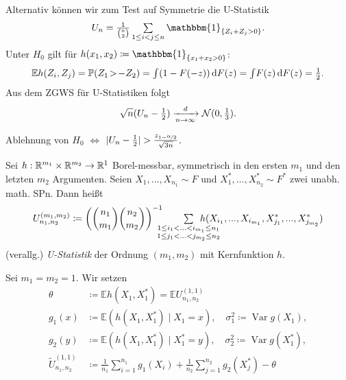 \documentclass{cheat-sheet}
\renewcommand{\P}{\mathbb{P}} %
\newcommand{\E}{\mathbb{E}} %
\newcommand{\ind}{\mathbbm{1}} %
\DeclareMathOperator{\var}{Var} %
\newcommand{\Normal}{\mathcal{N}} %
\begin{document}
\begin{bsp}
  Alternativ können wir zum Test auf Symmetrie die U-Statistik
  \[
    U_n = \tfrac{1}{\binom{n}{2}} \sum_{1 \leq i < j \leq n} \ind_{\{ Z_i + Z_j > 0 \}}.
  \]
  Unter $H_0$ gilt für $h(x_1, x_2) \coloneqq \ind_{\{ x_1 + x_2 > 0 \}}$:
  \[
    \E h(Z_i, Z_j)
    = \P(Z_1 \!>\! - Z_2)
    = \IInt{(1 - F(-z))}{F(z)}
    = \IInt{F(z)}{F(z)}
    = \tfrac{1}{2}.
  \]
  Aus dem ZGWS für U-Statistiken folgt
  \[
    \sqrt{n} (U_n - \tfrac{1}{2}) \xra[n \to \infty]{d} \Normal(0, \tfrac{1}{3}).
  \]
\end{bsp}

\begin{entscheidungsregel}
  Ablehnung von $H_0$ $\iff$
  $\lvert U_n - \tfrac{1}{2}\rvert > \tfrac{z_{1 - \nicefrac{\alpha}{2}}}{\sqrt{3n}}$.
\end{entscheidungsregel}



\begin{defn}
  Sei $h : \mathbb{R}^{m_1} \times \mathbb{R}^{m_2} \to \mathbb{R}^1$ Borel-messbar, symmetrisch in den ersten $m_1$ und den letzten $m_2$ Argumenten.
  Seien $X_1, \ldots, X_{n_1} \sim F$ und $X_1^*, \ldots, X_{n_2}^* \sim F^*$ zwei unabh. math. SPn.
  Dann heißt
  \[
    U_{n_1, n_2}^{(m_1, m_2)} \coloneqq \left( \binom{n_1}{m_1} \binom{n_2}{m_2} \right)^{-1} \qquad
    \sum_{\mathclap{\substack{1 \leq i_1 < \ldots < i_{m_1} \leq n_1 \\ 1 \leq j_1 < \ldots < j_{m_2} \leq n_2}}} \enspace
    h(X_{i_1}, \nldots, X_{i_{m_1}}, X_{j_1}^*, \nldots, X_{j_{m_2}}^*)
  \]
  (verallg.) \emph{U-Statistik} der Ordnung $(m_1, m_2)$ mit Kernfunktion $h$.
\end{defn}

\begin{nota}
  Sei $m_1 = m_2 = 1$.
  Wir setzen
  \begin{align*}
    \theta & \coloneqq \E h(X_1, X_1^*) = \E U_{n_1, n_2}^{(1, 1)} \\
    g_1(x) & \coloneqq \E( h(X_1, X_1^*) \mid X_1 = x), \quad
    \sigma_1^2 \coloneqq \var g(X_1), \\
    g_2(y) & \coloneqq \E( h(X_1, X_1^*) \mid X_1^* = y), \quad
    \sigma_2^2 \coloneqq \var g(X_1^*), \\
    \tilde{U}_{n_1, n_2}^{(1,1)} & \coloneqq \tfrac{1}{n_1} \sum_{i=1}^{n_1} g_1(X_i) + \tfrac{1}{n_2} \sum_{j=1}^{n_2} g_2(X_j^*) - \theta
  \end{align*}
\end{nota}
\end{document}
